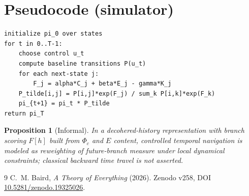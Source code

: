 \documentclass[11pt]{article}
\newtheorem{proposition}{Proposition}
\begin{document}
\section{Pseudocode (simulator)}
\begin{verbatim}
initialize pi_0 over states
for t in 0..T-1:
    choose control u_t
    compute baseline transitions P(u_t)
    for each next-state j:
        F_j = alpha*C_j + beta*E_j - gamma*K_j
    P_tilde[i,j] = P[i,j]*exp(F_j) / sum_k P[i,k]*exp(F_k)
    pi_{t+1} = pi_t * P_tilde
return pi_T
\end{verbatim}

\begin{proposition}[Informal]
In a decohered-history representation with branch scoring $F[h]$ built from $\Phi_c$ and $E$ content, controlled temporal navigation is modeled as reweighting of future-branch measure under local dynamical constraints; classical backward time travel is not asserted.
\end{proposition}

\begin{thebibliography}{9}
C.\ M. Baird, \emph{A Theory of Everything} (2026). Zenodo v258, DOI \href{https://doi.org/10.5281/zenodo.19325026}{10.5281/zenodo.19325026}.
\end{thebibliography}
\end{document}
